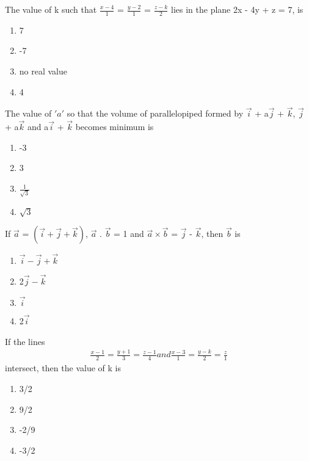 \item The value of k such that $\frac{x - 4}{1}$ = $\frac{y - 2}{1}$ = $\frac{z - k}{2}$ lies in the plane 2x - 4y + z = 7, is
\begin{enumerate}
\item 7
\item -7
\item no real value
\item 4
\end{enumerate}

\item The value of $'a'$ so that the volume of parallelopiped formed by $\overrightarrow{i}$ + a$\overrightarrow{j}$ + $\overrightarrow{k}$, $\overrightarrow{j}$ + a$\overrightarrow{k}$ and a$\overrightarrow{i}$ + $\overrightarrow{k}$ becomes minimum is
\begin{enumerate}
\item -3
\item 3
\item $\frac{1}{\sqrt{3}}$
\item $\sqrt{3}$
\end{enumerate}

\item If $\overrightarrow{a}$ = $(\overrightarrow{i} + \overrightarrow{j} + \overrightarrow{k})$, $\overrightarrow{a}$ . $\overrightarrow{b}$ = 1 and $\overrightarrow{a} \times \overrightarrow{b}$ = 
$\overrightarrow{j}$ - $\overrightarrow{k}$, then $\overrightarrow{b}$ is
\begin{enumerate}
\item $\overrightarrow{i} - \overrightarrow{j} + \overrightarrow{k}$
\item 2$\overrightarrow{j} - \overrightarrow{k}$
\item $\overrightarrow{i}$
\item 2$\overrightarrow{i}$
\end{enumerate}

\item If the lines 
\begin{align*}
\frac{x - 1}{2} = \frac{y + 1}{3} = \frac{z - 1}{4} and \frac{x - 3}{1} = \frac{y - k}{2} = \frac{z}{1}
\end{align*}
intersect, then the value of k is
\begin{enumerate}
\item 3/2
\item 9/2
\item -2/9
\item -3/2
\end{enumerate}

